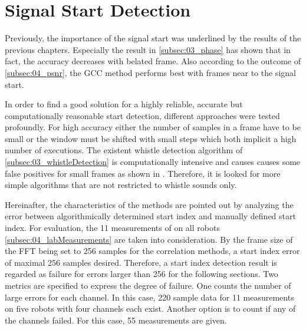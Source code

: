 \newpage
\section{Signal Start Detection}
\label{sec:04_signalStartDetection}

Previously, the importance of the signal start was underlined
by the results of the previous chapters.
Especially the result in \cref{subsec:03_phase} has shown that in fact, the accuracy
decreases with belated frame.
Also according to the outcome of \cref{subsec:04_psnr}, the \ac{GCC}
method performs best with frames near to the signal start.

In order to find a good solution for a highly reliable, accurate but
computationally reasonable start detection, different approaches were
tested profoundly.
For high accuracy either the number of samples in a frame have to be
small or the window must be shifted with small steps which both implicit
a high number of executions.
The existent whistle detection algorithm of \cref{subsec:03_whistleDetection}
is computationally intensive and causes causes some false positives
for small frames as shown in \label{subsec:04_whistleDetection}.
Therefore, it is looked for more simple algorithms that are not restricted
to whistle sounds only.

Hereinafter, the characteristics of the methods are pointed out by
analyzing the error between algorithmically determined start index
and manually defined start index.
For evaluation, the 11 measurements of on all robots \cref{subsec:04_labMeasurements}
are taken into consideration.
By the frame size of the \ac{FFT} being set to 256 samples for the
correlation methods, a start index error of maximal 256 samples
desired.
Therefore, a start index detection result is regarded as failure for errors
larger than 256 for the following sections.
Two metrics are specified to express the degree of failure.
One counts the number of large errors for each channel.
In this case, 220 sample data for 11 measurements on five robots with
four channels each exist.
Another option is to count if any of the channels failed.
For this case, 55 measurements are given.

